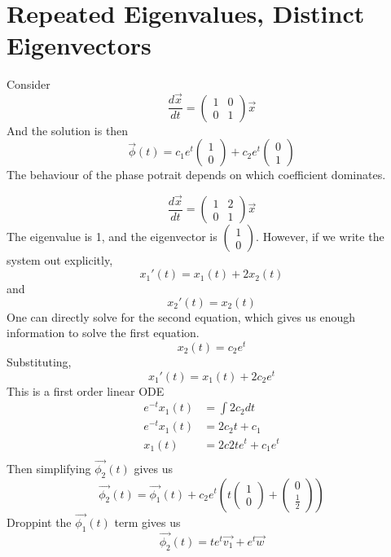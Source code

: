 \documentclass[12pt]{article}
\begin{document}
\section{Repeated Eigenvalues, Distinct Eigenvectors}
Consider
$$\frac{d\vec{x}}{dt} = \begin{pmatrix} 1 & 0 \\ 0 & 1 \end{pmatrix} \vec{x}$$
And the solution is then
$$\vec{\phi}(t) = c_1e^t\begin{pmatrix} 1 \\ 0 \end{pmatrix} + c_2e^t\begin{pmatrix} 0 \\ 1 \end{pmatrix}$$
The behaviour of the phase potrait depends on which coefficient dominates.

\begin{ex}
	$$\frac{d\vec{x}}{dt} = \begin{pmatrix} 1 & 2 \\ 0 & 1 \end{pmatrix} \vec{x}$$
	The eigenvalue is 1, and the eigenvector is $\begin{pmatrix} 1 \\ 0\end{pmatrix}$. However, if we write the system out explicitly,
	$$x_1'(t) = x_1(t) + 2x_2(t)$$
	and
	$$x_2'(t) = x_2(t)$$
	One can directly solve for the second equation, which gives us enough information to solve the first equation.
	$$x_2(t) = c_2e^t$$
	Substituting,
	$$x_1'(t) = x_1(t) + 2c_2e^t$$
	This is a first order linear ODE
	\begin{align*}
		e^{-t}x_1(t) &= \int 2c_2 dt \\
		e^{-t}x_1(t) &= 2c_2t + c_1 \\
		x_1(t) &= 2c2te^t + c_1e^t \\
	\end{align*}
	Then simplifying $\vec{\phi_2}(t)$ gives us
	$$\vec{\phi_2}(t) = \vec{\phi_1}(t) + c_2e^t \left(t\begin{pmatrix} 1 \\ 0 \end{pmatrix} + \begin{pmatrix} 0 \\ \frac{1}{2}\end{pmatrix}\right)$$
	Droppint the $\vec{\phi_1}(t)$ term gives us
	$$\vec{\phi_2}(t) = te^t\vec{v_1} + e^t\vec{w}$$
\end{ex}
\end{document}
